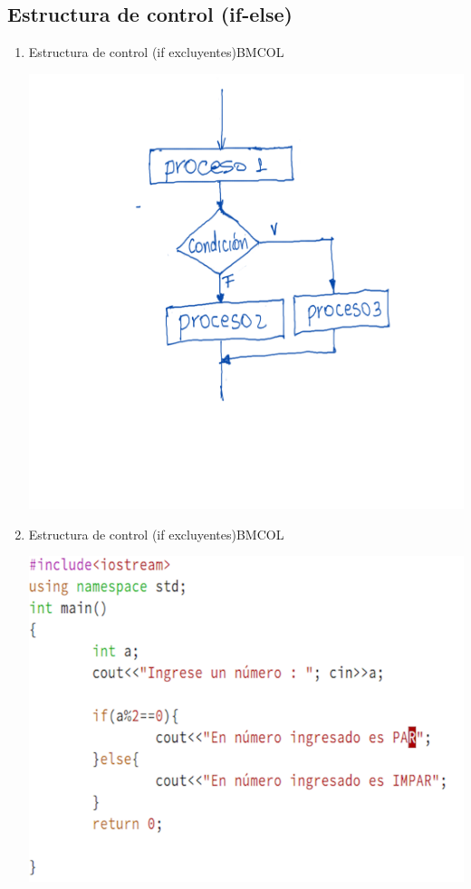 \documentclass[presentation, aspectratio=54]{beamer}
\begin{document}
\subsection{Estructura de control (if-else)}
\label{sec:orgf449e2a}
\begin{enumerate}
\item Estructura de control (if excluyentes)\hfill{}\textsc{BMCOL}
\label{sec:org2e0cc7e}
\begin{center}
\includegraphics[width=.9\linewidth]{./images/codigo/ifsino2.png}
\end{center}

\item Estructura de control (if excluyentes)\hfill{}\textsc{BMCOL}
\label{sec:org42bd195}
\begin{center}
\includegraphics[width=.9\linewidth]{./images/codigo/code-ifsino.png}
\end{center}
\end{enumerate}
\end{document}
